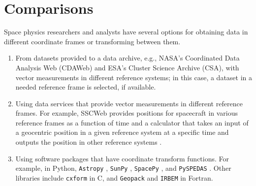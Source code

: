 \documentclass[draft]{agujournal2019}
\begin{document}
\begin{itemize}


\end{itemize}


\section{Comparisons}
\label{sect:comparisons}

Space physics researchers and analysts have several options for obtaining data in different coordinate frames or transforming between them.

\begin{enumerate}

    \parskip 0.1in 

    \item From datasets provided to a data archive, e.g., NASA's Coordinated Data Analysis Web (CDAWeb) and ESA's Cluster Science Archive (CSA), with vector measurements in different reference systems; in this case, a dataset in a needed reference frame is selected, if available.

    \item Using data services that provide vector measurements in different reference frames. For example, SSCWeb provides positions for spacecraft in various reference frames as a function of time \cite{SSCWeb} and a calculator that takes an input of a geocentric position in a given reference system at a specific time and outputs the position in other reference systems \cite{SSCWebCoordinateCalculator}.

    \item Using software packages that have coordinate transform functions. For example, in Python, \texttt{Astropy} \cite{AstroPy2022}, \texttt{SunPy} \cite{SunPy}, \texttt{SpacePy} \cite{SpacePy}, and \texttt{PySPEDAS} \cite{Angelopoulos2024}. Other libraries include \texttt{cxform} \cite{cxform} in C, and \texttt{Geopack} \cite{Tsyganenko2008} and \texttt{IRBEM} \cite{IRBEM2022} in Fortran.

\end{enumerate}
\end{document}

